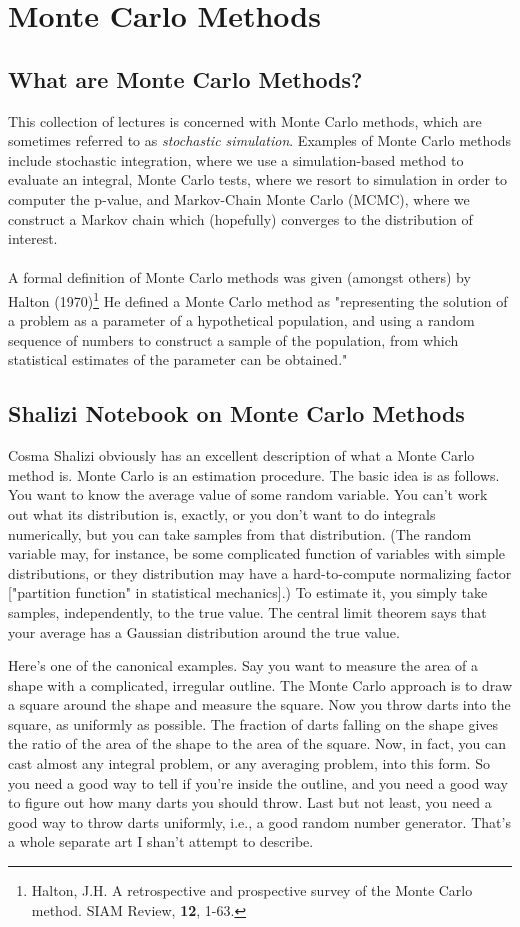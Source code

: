 \documentclass[a4paper,10pt]{article}
\begin{document}
\section{Monte Carlo Methods}
\subsection{What are Monte Carlo Methods?}
This collection of lectures is concerned with Monte Carlo methods, which are sometimes referred to as \textit{stochastic
simulation}. Examples of Monte Carlo methods include stochastic integration, where we use a simulation-based method to
evaluate an integral, Monte Carlo tests, where we resort to simulation in order to computer the p-value, and Markov-Chain
Monte Carlo (MCMC), where we construct a Markov chain which (hopefully) converges to the distribution of interest.
    \paragraph{} A formal definition of Monte Carlo methods was given (amongst others) by Halton (1970)\footnote{Halton, J.H. 
    A retrospective and prospective survey of the Monte Carlo method. SIAM Review, \textbf{12}, 1-63.} 
    He defined a Monte Carlo method as "representing the solution of a problem as a parameter of a hypothetical
    population, and using a random sequence of numbers to construct a sample of the population, from which 
    statistical estimates of the parameter can be obtained."
\subsection{Shalizi Notebook on Monte Carlo Methods}
Cosma Shalizi obviously has an excellent description of what a Monte Carlo method is.
Monte Carlo is an estimation procedure. The basic idea is as follows. You want to know the average value of some 
random variable. You can't work out what its distribution is, exactly, or you don't want to do integrals numerically, 
but you can take samples from that distribution. (The random variable may, for instance, be some complicated function of variables 
with simple distributions, or they distribution may have a hard-to-compute normalizing factor 
["partition function" in statistical mechanics].) To estimate it, you simply take samples, independently, 
to the true value. The central limit theorem says that your average has a Gaussian distribution around the 
true value.

Here's one of the canonical examples. Say you want to measure the area of a shape with a 
complicated, irregular outline. The Monte Carlo approach is to draw a square around the shape and 
measure the square. Now you throw darts into the square, as uniformly as possible. 
The fraction of darts falling on the shape gives the ratio of the area of the shape to the area of the square. 
Now, in fact, you can cast almost any integral problem, or any averaging problem, into this form. So you need a 
good way to tell if you're inside the outline, and you need a good way to figure out how many darts you should throw. Last but not least, you need a good way to throw darts uniformly, i.e., a good random number generator. 
That's a whole separate art I shan't attempt to describe.
\end{document}
